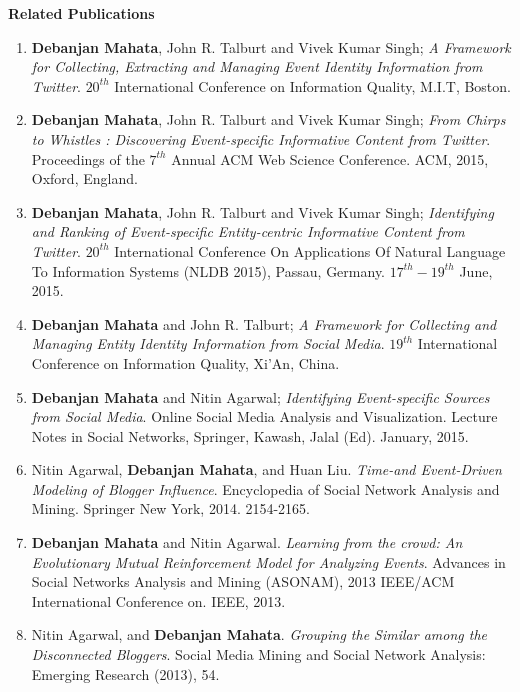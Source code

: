 \textbf{\LARGE Related Publications}

\begin{enumerate}

\item \textbf{Debanjan Mahata}, John R. Talburt and Vivek Kumar Singh; \textit{A Framework for Collecting, Extracting and Managing Event Identity Information from Twitter}. $20^{th}$ International Conference on Information Quality, M.I.T, Boston.

\item \textbf{Debanjan Mahata}, John R. Talburt and Vivek Kumar Singh; \textit{From Chirps to Whistles : Discovering Event-specific Informative Content from Twitter}. Proceedings of the $7^{th}$ Annual ACM Web Science Conference. ACM, 2015, Oxford, England.


\item \textbf{Debanjan Mahata}, John R. Talburt and Vivek Kumar Singh; \textit{Identifying and Ranking of Event-specific Entity-centric Informative Content from Twitter}. $20^{th}$ International Conference On Applications Of Natural Language To Information Systems (NLDB 2015), Passau, Germany. $17^{th}-19^{th}$ June, 2015.

\item \textbf{Debanjan Mahata} and John R. Talburt; \textit{A Framework for Collecting and Managing Entity Identity Information from Social Media}. $19^{th}$ International Conference on Information Quality, Xi'An, China.

\item \textbf{Debanjan Mahata} and Nitin Agarwal; \textit{Identifying Event-specific Sources from Social Media}. Online Social Media Analysis and Visualization. Lecture Notes in Social Networks, Springer, Kawash, Jalal (Ed). January, 2015.

\item Nitin Agarwal, \textbf{Debanjan Mahata}, and Huan Liu. \textit{Time-and Event-Driven Modeling of Blogger Influence}. Encyclopedia of Social Network Analysis and Mining. Springer New York, 2014. 2154-2165.


\item \textbf{Debanjan Mahata} and Nitin Agarwal. \textit{Learning from the crowd: An Evolutionary Mutual Reinforcement Model for Analyzing Events}. Advances in Social Networks Analysis and Mining (ASONAM), 2013 IEEE/ACM International Conference on. IEEE, 2013.

\item Nitin Agarwal, and \textbf{Debanjan Mahata}. \textit{Grouping the Similar among the Disconnected Bloggers}. Social Media Mining and Social Network Analysis: Emerging Research (2013), 54.


\end{enumerate}
